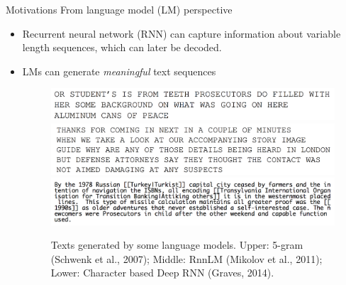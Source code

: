\documentclass[pdf]{beamer}
\begin{document}
\begin{frame}{Motivations}
From language model (LM) perspective
\begin{itemize}
\item Recurrent neural network (RNN) can capture information about variable length sequences, which can later be decoded.
\item LMs can generate \textit{meaningful} text sequences
\begin{figure}[ht!]
\begin{center}
\includegraphics[scale=0.25]{4-gram.png} \\
\includegraphics[scale=0.25]{rnn.png} \\
\includegraphics[scale=0.40]{rnn_char.png}
\end{center}
\caption{\scriptsize{Texts generated by some language models. Upper: 5-gram (Schwenk et al., 2007); Middle: RnnLM (Mikolov et al., 2011); Lower: Character based Deep RNN (Graves, 2014).}}
\end{figure}
\end{itemize}
\end{frame}
\end{document}
